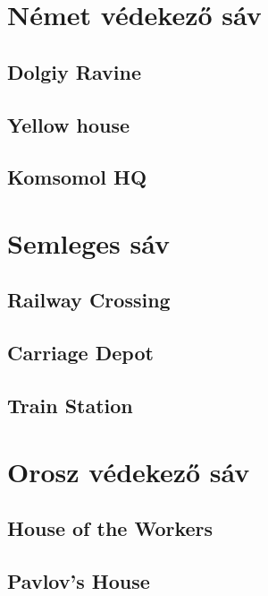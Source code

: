 \section{Német védekező sáv}
\subsection{Dolgiy Ravine}

\subsection{Yellow house}

\subsection{Komsomol HQ}

\section{Semleges sáv}
\subsection{Railway Crossing}

\subsection{Carriage Depot}

\subsection{Train Station}

\section{Orosz védekező sáv}
\subsection{House of the Workers}

\subsection{Pavlov's House}

